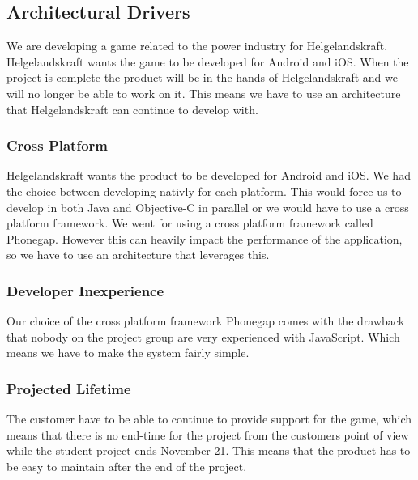 \subsection{Architectural Drivers}
We are developing a game related to the power industry for Helgelandskraft. Helgelandskraft wants the game to be developed for Android and iOS. When the project is complete the product will be in the hands of Helgelandskraft and we will no longer be able to work on it. This means we have to use an architecture that Helgelandskraft can continue to develop with.

\subsubsection*{Cross Platform}
Helgelandskraft wants the product to be developed for Android and iOS. We had the choice between developing nativly for each platform. This would force us to develop in both Java and Objective-C in parallel or we would have to use a cross platform framework. We went for using a cross platform framework called Phonegap. However this can heavily impact the performance of the application, so we have to use an architecture that leverages this.

\subsubsection*{Developer Inexperience}
Our choice of the cross platform framework Phonegap comes with the drawback that nobody on the project group are very experienced with JavaScript. Which means we have to make the system fairly simple.

\subsubsection*{Projected Lifetime}
The customer have to be able to continue to provide support for the game, which means that there is no end-time for the project from the customers point of view while the student project ends November 21. This means that the product has to be easy to maintain after the end of the project.
